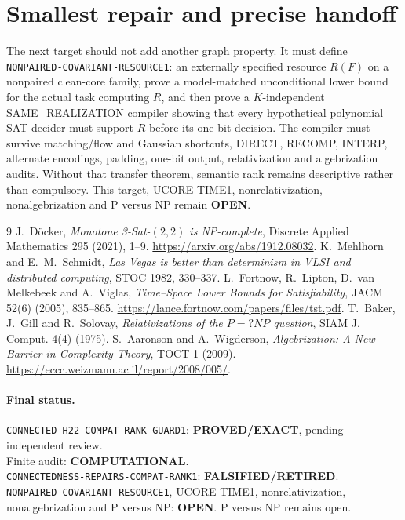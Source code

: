 \documentclass[11pt]{article}
\newcommand{\EXACT}{\textbf{PROVED/EXACT}}
\newcommand{\OPEN}{\textbf{OPEN}}
\newcommand{\RETIRED}{\textbf{FALSIFIED/RETIRED}}
\newcommand{\COMP}{\textbf{COMPUTATIONAL}}
\begin{document}
\section{Smallest repair and precise handoff}

The next target should not add another graph property.  It must define
\texttt{NONPAIRED-COVARIANT-RESOURCE1}: an externally specified resource
$R(F)$ on a nonpaired clean-core family, prove a model-matched unconditional
lower bound for the actual task computing $R$, and then prove a
$K$-independent SAME\_REALIZATION compiler showing that every hypothetical
polynomial SAT decider must support $R$ before its one-bit decision.  The
compiler must survive matching/flow and Gaussian shortcuts, DIRECT, RECOMP,
INTERP, alternate encodings, padding, one-bit output, relativization and
algebrization audits.  Without that transfer theorem, semantic rank remains
descriptive rather than compulsory.  This target, UCORE-TIME1,
nonrelativization, nonalgebrization and P versus NP remain \OPEN.

\begin{thebibliography}{9}
 J.~D\"ocker,
\emph{Monotone 3-Sat-$(2,2)$ is NP-complete},
Discrete Applied Mathematics 295 (2021), 1--9.
\url{https://arxiv.org/abs/1912.08032}.
 K.~Mehlhorn and E.~M.~Schmidt,
\emph{Las Vegas is better than determinism in VLSI and distributed
computing}, STOC 1982, 330--337.
 L.~Fortnow, R.~Lipton, D.~van Melkebeek and A.~Viglas,
\emph{Time--Space Lower Bounds for Satisfiability}, JACM 52(6) (2005),
835--865. \url{https://lance.fortnow.com/papers/files/tst.pdf}.
 T.~Baker, J.~Gill and R.~Solovay,
\emph{Relativizations of the $P=?NP$ question}, SIAM J. Comput. 4(4) (1975).
 S.~Aaronson and A.~Wigderson,
\emph{Algebrization: A New Barrier in Complexity Theory}, TOCT 1 (2009).
\url{https://eccc.weizmann.ac.il/report/2008/005/}.
\end{thebibliography}

\paragraph{Final status.}
\texttt{CONNECTED-H22-COMPAT-RANK-GUARD1}: \EXACT, pending independent review.\\
Finite audit: \COMP.\\
\texttt{CONNECTEDNESS-REPAIRS-COMPAT-RANK1}: \RETIRED.\\
\texttt{NONPAIRED-COVARIANT-RESOURCE1}, UCORE-TIME1,
nonrelativization, nonalgebrization and P versus NP: \OPEN.
P versus NP remains open.

\end{document}
